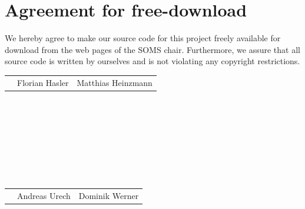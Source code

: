 \documentclass[11pt]{article}
\begin{document}
\renewcommand{\figurename}{Figure}


\newpage


\newpage
\setcounter{page}{1}
\section*{Agreement for free-download}
\bigskip


\bigskip


\large We hereby agree to make our source code for this project freely available for download from the web pages of the SOMS chair. Furthermore, we assure that all source code is written by ourselves and is not violating any copyright restrictions.

\begin{center}

\bigskip


\bigskip

\begin{tabular}{@{}p{3.3cm}@{}p{6cm}@{}@{}p{6cm}@{}}
\begin{minipage}{3cm}

\end{minipage}
&
\begin{minipage}{6cm}
\large Florian Hasler
\end{minipage}
&
\begin{minipage}{6cm}
\large Matthias Heinzmann
\end{minipage}
\end{tabular}
\ \\
\ \\
\ \\
\ \\
\ \\
\ \\
\ \\
\begin{tabular}{@{}p{3.3cm}@{}p{6cm}@{}@{}p{6cm}@{}}
\begin{minipage}{3cm}
\end{minipage}
&
\begin{minipage}{6cm}
\large Andreas Urech
\end{minipage}
&
\begin{minipage}{6cm}
\large Dominik Werner
\end{minipage}
\end{tabular}
\end{center}
\newpage
\end{document}
